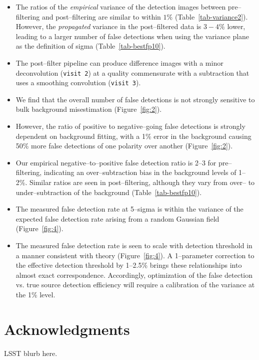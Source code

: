 \documentclass[iop]{emulateapj}
\begin{document}
\begin{itemize}
\item The ratios of the {\it empirical} variance of the detection images between pre--filtering and post--filtering are similar to within $1\%$ (Table~\ref{tab-variance2}).
  However, the {\it propagated} variance in the post--filtered data is $3-4\%$ lower, leading to a larger number of false detections when using the variance plane as the definition of sigma (Table~\ref{tab-bestfp10}).



\item The post--filter pipeline can produce difference images with a minor deconvolution ({\tt visit 2}) at a quality commensurate with a subtraction that uses a smoothing convolution ({\tt visit 3}).


\item We find that the overall number of false detections is not strongly sensitive to bulk background misestimation (Figure~\ref{fig:2}).

\item However, the ratio of positive to negative--going false detections is strongly dependent on background fitting, with a 1\% error in the background causing 50\% more false detections of one polarity over another (Figure~\ref{fig:2}).

\item Our empirical negative--to--positive false detection ratio is 2--3 for pre--filtering, indicating an over--subtraction bias in the background levels of 1--2\%.
  Similar ratios are seen in post--filtering, although they vary from over-- to under--subtraction of the background (Table~\ref{tab-bestfp10}).


\item The measured false detection rate at 5--sigma is within the variance of the expected false detection rate arising from a random Gaussian field (Figure~\ref{fig:4}).

\item The measured false detection rate is seen to scale with detection threshold in a manner consistent with theory (Figure~\ref{fig:4}).
  A 1--parameter correction to the effective detection threshold by 1--2.5\% brings these relationships into almost exact correspondence.
  Accordingly, optimization of the false detection vs. true source detection efficiency will require a calibration of the variance at the 1\% level.

\end{itemize}

\section*{Acknowledgments}
LSST blurb here.



\end{document}
